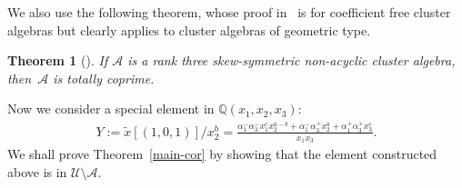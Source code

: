 \documentclass[pdftex]{sigma}
\numberwithin{equation}{section}
\newtheorem{Theorem}{Theorem}[section]
\begin{document}
We also use the following theorem, whose proof in~\cite{MM} is for coef\/f\/icient free cluster algebras but clearly applies to cluster algebras of geometric type.
\begin{Theorem}[]
\label{coprime}
If $\mathcal{A}$ is a rank three skew-symmetric non-acyclic cluster algebra, then~$\mathcal{A}$ is totally coprime.
\end{Theorem}

Now we consider a special element in $\mathbb{Q}(x_1,x_2,x_3)$:
\begin{gather*}
Y:=\tilde{x}[(1,0,1)]/x_2^b =\frac{\alpha_1^-\alpha_3^-x_1^cx_2^{a-b}+\alpha_1^-\alpha_3^+x_2^a+\alpha_1^+\alpha_3^+x_3^c}{x_1x_3}.
\end{gather*}
We shall prove Theorem~\ref{main-cor} by showing that the element constructed above is in $\mathcal{U}\setminus\mathcal{A}$.
\end{document}
